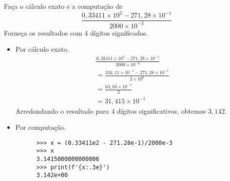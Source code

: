 \begin{exeresol}
  Faça o cálculo exato e a computação de
  \begin{equation}
    \frac{0,33411\times 10^2 - 271,28\times 10^{-1}}{2000\times 10^{-3}}
  \end{equation}
  Forneça os resultados com 4 dígitos significados.
\end{exeresol}
\begin{resol}
  \begin{itemize}
  \item Por cálculo exato.
    \begin{gather}
      \frac{0,33411\times 10^2 - 271,28\times 10^{-1}}{2000\times 10^{-3}}\\
      = \frac{334,11\times 10^{-1} - 271,28\times 10^{-1}}{2\times 10^0}\\
      = \frac{63,83\times 10^{-1}}{2}\\
      = 31,415\times 10^{-1}
    \end{gather}
    Arredondando o resultado para 4 dígitos significativos, obtemos $3,142$.
  \item Por computação.
    \begin{lstlisting}
      >>> x = (0.33411e2 - 271.28e-1)/2000e-3
      >>> x
      3.1415000000000006
      >>> print(f'{x:.3e}')
      3.142e+00
    \end{lstlisting}
  \end{itemize}
\end{resol}


